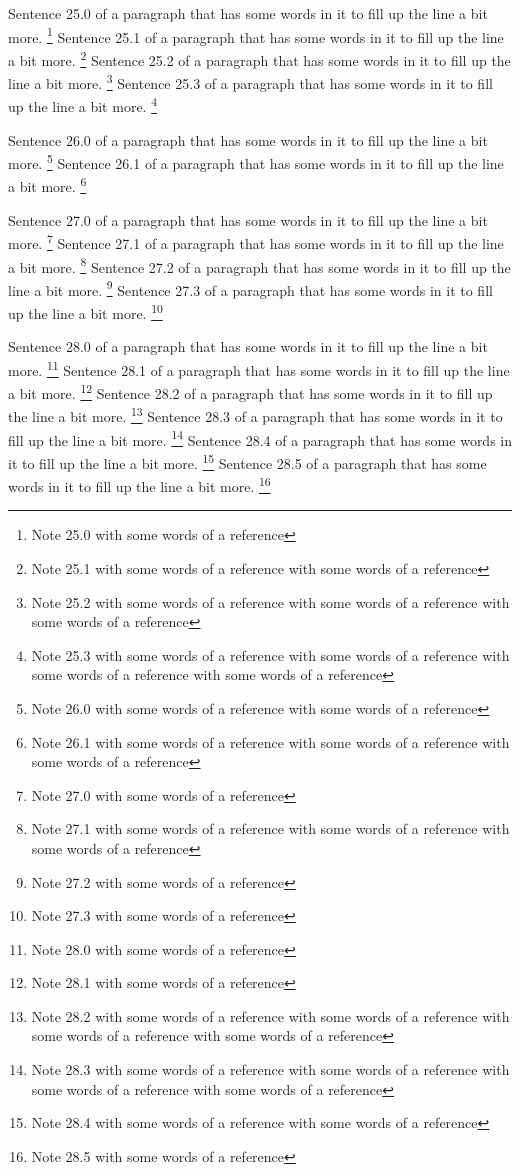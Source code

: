 Sentence 25.0 of a paragraph that has some words in it to fill up the line a bit more. \footnote{Note 25.0 with some words of a reference} Sentence 25.1 of a paragraph that has some words in it to fill up the line a bit more. \footnote{Note 25.1 with some words of a reference with some words of a reference} Sentence 25.2 of a paragraph that has some words in it to fill up the line a bit more. \footnote{Note 25.2 with some words of a reference with some words of a reference with some words of a reference} Sentence 25.3 of a paragraph that has some words in it to fill up the line a bit more. \footnote{Note 25.3 with some words of a reference with some words of a reference with some words of a reference with some words of a reference}

Sentence 26.0 of a paragraph that has some words in it to fill up the line a bit more. \footnote{Note 26.0 with some words of a reference with some words of a reference} Sentence 26.1 of a paragraph that has some words in it to fill up the line a bit more. \footnote{Note 26.1 with some words of a reference with some words of a reference with some words of a reference}

Sentence 27.0 of a paragraph that has some words in it to fill up the line a bit more. \footnote{Note 27.0 with some words of a reference} Sentence 27.1 of a paragraph that has some words in it to fill up the line a bit more. \footnote{Note 27.1 with some words of a reference with some words of a reference with some words of a reference} Sentence 27.2 of a paragraph that has some words in it to fill up the line a bit more. \footnote{Note 27.2 with some words of a reference} Sentence 27.3 of a paragraph that has some words in it to fill up the line a bit more. \footnote{Note 27.3 with some words of a reference}

Sentence 28.0 of a paragraph that has some words in it to fill up the line a bit more. \footnote{Note 28.0 with some words of a reference} Sentence 28.1 of a paragraph that has some words in it to fill up the line a bit more. \footnote{Note 28.1 with some words of a reference} Sentence 28.2 of a paragraph that has some words in it to fill up the line a bit more. \footnote{Note 28.2 with some words of a reference with some words of a reference with some words of a reference with some words of a reference} Sentence 28.3 of a paragraph that has some words in it to fill up the line a bit more. \footnote{Note 28.3 with some words of a reference with some words of a reference with some words of a reference with some words of a reference} Sentence 28.4 of a paragraph that has some words in it to fill up the line a bit more. \footnote{Note 28.4 with some words of a reference with some words of a reference} Sentence 28.5 of a paragraph that has some words in it to fill up the line a bit more. \footnote{Note 28.5 with some words of a reference}

